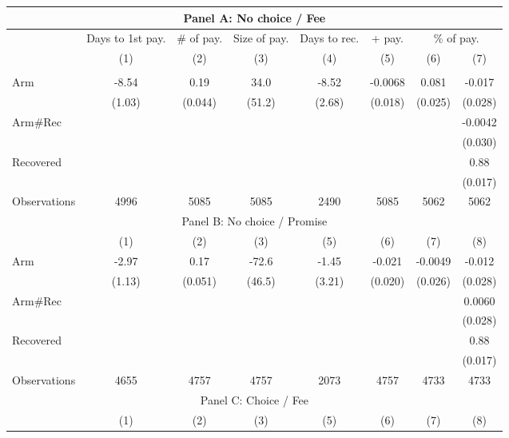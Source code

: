 \begin{tabular}{lccccccc}
\toprule
\multicolumn{8}{c}{Panel A: No choice / Fee} \\
\midrule
\midrule
      & Days to 1st pay. & \# of pay. & Size of pay. & Days to rec. & + pay. & \multicolumn{2}{c}{\% of pay.} \\
\midrule
      & (1)   & (2)   & (3)   & (4)   & (5)   & (6)   & (7) \\
\midrule
\midrule
      &       &       &       &       &       &       &  \\
Arm   & -8.54 & 0.19  & 34.0  & -8.52 & -0.0068 & 0.081 & -0.017 \\
      & (1.03) & (0.044) & (51.2) & (2.68) & (0.018) & (0.025) & (0.028) \\
Arm\#Rec &       &       &       &       &       &       & -0.0042 \\
      &       &       &       &       &       &       & (0.030) \\
Recovered &       &       &       &       &       &       & 0.88 \\
      &       &       &       &       &       &       & (0.017) \\
\midrule
Observations & 4996  & 5085  & 5085  & 2490  & 5085  & 5062  & 5062 \\
\midrule
\multicolumn{8}{c}{Panel B: No choice / Promise} \\
\midrule
\midrule
      & (1)   & (2)   & (3)   & (5)   & (6)   & (7)   & (8) \\
\midrule
\midrule
Arm   & -2.97 & 0.17  & -72.6 & -1.45 & -0.021 & -0.0049 & -0.012 \\
      & (1.13) & (0.051) & (46.5) & (3.21) & (0.020) & (0.026) & (0.028) \\
Arm\#Rec &       &       &       &       &       &       & 0.0060 \\
      &       &       &       &       &       &       & (0.028) \\
Recovered &       &       &       &       &       &       & 0.88 \\
      &       &       &       &       &       &       & (0.017) \\
\midrule
Observations & 4655  & 4757  & 4757  & 2073  & 4757  & 4733  & 4733 \\
\midrule
\multicolumn{8}{c}{Panel C: Choice / Fee} \\
\midrule
\midrule
      & (1)   & (2)   & (3)   & (5)   & (6)   & (7)   & (8) \\

\end{tabular}
